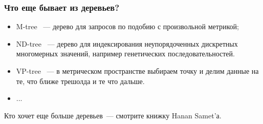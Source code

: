 \documentclass{beamer}
\begin{document}
\begin{frame}
\frametitle{Что еще бывает из деревьев?}
\scriptsize
\begin{multicols}{2}
\begin{itemize}
	\setlength\itemsep{1em}
	\item M-tree \cite{Ciaccia1997}~--- дерево для запросов по подобию с произвольной метрикой;
	\item ND-tree \cite{Qian2006}~--- дерево для индексирования неупорядоченных дискретных многомерных значений, например генетических последовательностей.
	\item VP-tree \cite{Yianilos1993}~--- в метрическом пространстве выбираем точку и делим данные на те, что ближе трешолда и те что дальше.
	\item ...
	
\end{itemize}

Кто хочет еще больше деревьев~--- смотрите книжку Hanan Samet'а.

	\columnbreak
	

\end{multicols}
\end{frame}
\end{document}
